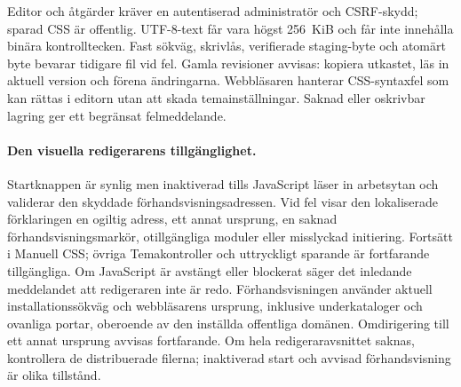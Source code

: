 \documentclass[11pt,a4paper]{article}
\begin{document}
Editor och åtgärder kräver en autentiserad administratör och CSRF-skydd; sparad
CSS är offentlig. UTF-8-text får vara högst 256~KiB och får inte innehålla
binära kontrolltecken. Fast sökväg, skrivlås, verifierade staging-byte och
atomärt byte bevarar tidigare fil vid fel. Gamla revisioner avvisas: kopiera
utkastet, läs in aktuell version och förena ändringarna. Webbläsaren hanterar
CSS-syntaxfel som kan rättas i editorn utan att skada temainställningar. Saknad
eller oskrivbar lagring ger ett begränsat felmeddelande.

\paragraph{Den visuella redigerarens tillgänglighet.} Startknappen är synlig men
inaktiverad tills JavaScript läser in arbetsytan och validerar den skyddade
förhandsvisningsadressen. Vid fel visar den lokaliserade förklaringen en ogiltig
adress, ett annat ursprung, en saknad förhandsvisningsmarkör, otillgängliga
moduler eller misslyckad initiering. Fortsätt i Manuell CSS; övriga
Temakontroller och uttryckligt sparande är fortfarande tillgängliga. Om
JavaScript är avstängt eller blockerat säger det inledande meddelandet att
redigeraren inte är redo. Förhandsvisningen använder aktuell installationssökväg
och webbläsarens ursprung, inklusive underkataloger och ovanliga portar,
oberoende av den inställda offentliga domänen. Omdirigering till ett annat
ursprung avvisas fortfarande. Om hela redigeraravsnittet saknas, kontrollera de
distribuerade filerna; inaktiverad start och avvisad förhandsvisning är olika
tillstånd.
\end{document}
